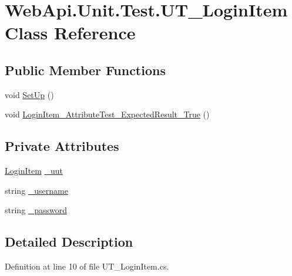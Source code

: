 \hypertarget{class_web_api_1_1_unit_1_1_test_1_1_u_t___login_item}{}\section{Web\+Api.\+Unit.\+Test.\+U\+T\+\_\+\+Login\+Item Class Reference}
\label{class_web_api_1_1_unit_1_1_test_1_1_u_t___login_item}
\subsection*{Public Member Functions}
\begin{DoxyCompactItemize}
\item 
void \mbox{\hyperlink{class_web_api_1_1_unit_1_1_test_1_1_u_t___login_item_ae918857f713646d96b728e936df4fd64}{Set\+Up}} ()
\item 
void \mbox{\hyperlink{class_web_api_1_1_unit_1_1_test_1_1_u_t___login_item_aa336ab34d433a1a4ed78bbfc3c56a761}{Login\+Item\+\_\+\+Attribute\+Test\+\_\+\+Expected\+Result\+\_\+\+True}} ()
\end{DoxyCompactItemize}
\subsection*{Private Attributes}
\begin{DoxyCompactItemize}
\item 
\mbox{\hyperlink{class_f_w_p_s_1_1_models_1_1_login_item}{Login\+Item}} \mbox{\hyperlink{class_web_api_1_1_unit_1_1_test_1_1_u_t___login_item_a34b426e31b37a717da3dbd1259acc881}{\+\_\+uut}}
\item 
string \mbox{\hyperlink{class_web_api_1_1_unit_1_1_test_1_1_u_t___login_item_a75e7015fe29038163b1541bb8538fb49}{\+\_\+username}}
\item 
string \mbox{\hyperlink{class_web_api_1_1_unit_1_1_test_1_1_u_t___login_item_a308e19465bddb46f8351e02f3449f999}{\+\_\+password}}
\end{DoxyCompactItemize}


\subsection{Detailed Description}


Definition at line 10 of file U\+T\+\_\+\+Login\+Item.\+cs.



